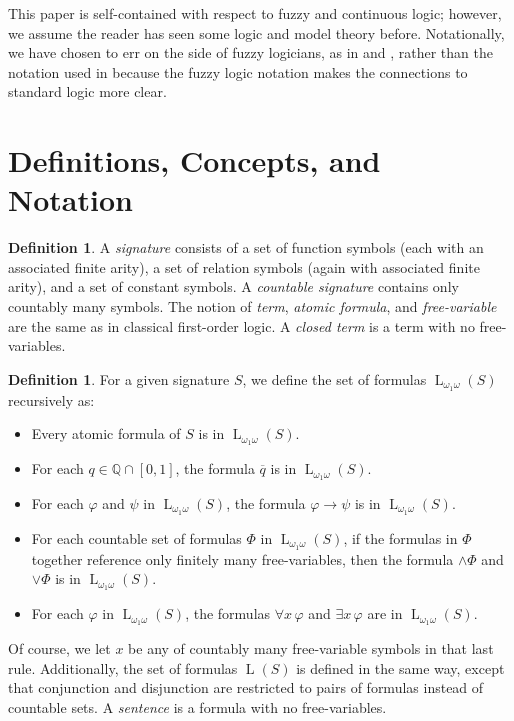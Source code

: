 \documentclass{amsart}
\theoremstyle{definition}
\newtheorem{definition}[theorem]{Definition}
\numberwithin{equation}{theorem}
\renewcommand{\phi}{\varphi}
\newcommand{\Q}{\mathbb{Q}}
\newcommand{\unvee}{{\vee}}
\newcommand{\unwedge}{{\wedge}}
\newcommand{\rat}[1]{{\overline{#1}}}
\newcommand{\narrow}[1]{\xrightarrow{#1}}
\renewcommand{\to}{\narrow{}}
\newcommand{\baselang}{\operatorname{L}}
\newcommand{\lang}{\baselang_{\omega_1\omega}}
\begin{document}
This paper is self-contained with respect to fuzzy and continuous logic; however, we assume the reader has seen some logic and model theory before.
Notationally, we have chosen to err on the side of fuzzy logicians, as in \cite{hajek1998metamathematics} and \cite{metcalfe2008proof}, rather than the notation used in \cite{yaacov2008model} because the fuzzy logic notation makes the connections to standard logic more clear.

\newpage
\section{Definitions, Concepts, and Notation}
\begin{definition}
  A \emph{signature} consists of a set of function symbols (each with an associated finite arity), a set of relation symbols (again with associated finite arity), and a set of constant symbols.
  A \emph{countable signature} contains only countably many symbols.
  The notion of \emph{term}, \emph{atomic formula}, and \emph{free-variable} are the same as in classical first-order logic.
  A \emph{closed term} is a term with no free-variables.
\end{definition}
\begin{definition}
  For a given signature $S$, we define the set of formulas $\lang(S)$ recursively as:
  \begin{itemize}
  \item Every atomic formula of $S$ is in $\lang(S)$.
  \item For each $q\in\Q\cap[0,1]$, the formula $\rat q$ is in $\lang(S)$.
  \item For each $\phi$ and $\psi$ in $\lang(S)$, the formula $\phi\to\psi$ is in $\lang(S)$.
  \item For each countable set of formulas $\Phi$ in $\lang(S)$, if the formulas in $\Phi$ together reference only finitely many free-variables, then the formula $\unwedge\Phi$ and $\unvee\Phi$ is in $\lang(S)$.
  \item For each $\phi$ in $\lang(S)$, the formulas $\forall x\,\phi$ and $\exists x\,\phi$ are in $\lang(S)$.
  \end{itemize}
  Of course, we let $x$ be any of countably many free-variable symbols in that last rule.
  Additionally, the set of formulas $\baselang(S)$ is defined in the same way, except that conjunction and disjunction are restricted to pairs of formulas instead of countable sets.
  A \emph{sentence} is a formula with no free-variables.
\end{definition}
\end{document}
